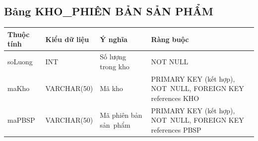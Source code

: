 \documentclass[a4paper,12pt]{report}
\begin{document}
\subsection{Bảng KHO\_PHIÊN BẢN SẢN PHẨM}
\noindent
\begin{center}
    \begin{tabular}{|>{\centering\arraybackslash}p{3cm}|
        >{\centering\arraybackslash}p{4cm}|
        >{\centering\arraybackslash}p{4cm}|
        >{\centering\arraybackslash}p{4cm}|}
        \hline
        \textbf{Thuộc tính}                                                                                                               &
        \textbf{Kiểu dữ liệu}                                                                                                                             &
        \textbf{Ý nghĩa}                                                                                                 &
        \textbf{Ràng buộc}                                                                                                         \\
        \hline
        soLuong &  INT  & Số lượng trong kho & NOT NULL \\
        \hline
        maKho &  VARCHAR(50)  & Mã kho & PRIMARY KEY (kết hợp), NOT~NULL, FOREIGN KEY references KHO \\                                                                                                                          
        \hline
        maPBSP &  VARCHAR(50)  & Mã phiên bản sản~phẩm & PRIMARY KEY (kết hợp), NOT~NULL, FOREIGN KEY references PBSP \\
        \hline
    \end{tabular}
\end{center}
\end{document}
